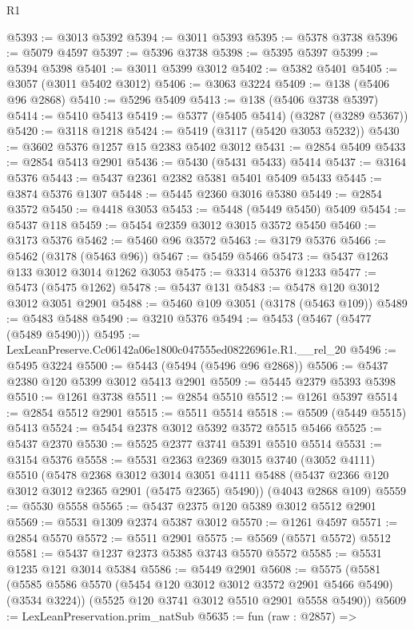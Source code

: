 \begin{lexlean}{R1}
\begin{coremodule}
@5393 := @3013 @5392
@5394 := @3011 @5393
@5395 := @5378 @3738
@5396 := @5079 @4597
@5397 := @5396 @3738
@5398 := @5395 @5397
@5399 := @5394 @5398
@5401 := @3011 @5399 @3012
@5402 := @5382 @5401
@5405 := @3057 (@3011 @5402 @3012)
@5406 := @3063 @3224
@5409 := @138 (@5406 @96 @2868)
@5410 := @5296 @5409
@5413 := @138 (@5406 @3738 @5397)
@5414 := @5410 @5413
@5419 := @5377 (@5405 @5414) (@3287 (@3289 @5367))
@5420 := @3118 @1218
@5424 := @5419 (@3117 (@5420 @3053 @5232))
@5430 := @3602 @5376 @1257 @15 @2383 @5402 @3012
@5431 := @2854 @5409
@5433 := @2854 @5413 @2901
@5436 := @5430 (@5431 @5433) @5414
@5437 := @3164 @5376
@5443 := @5437 @2361 @2382 @5381 @5401 @5409 @5433
@5445 := @3874 @5376 @1307
@5448 := @5445 @2360 @3016 @5380
@5449 := @2854 @3572
@5450 := @4418 @3053
@5453 := @5448 (@5449 @5450) @5409
@5454 := @5437 @118
@5459 := @5454 @2359 @3012 @3015 @3572 @5450
@5460 := @3173 @5376
@5462 := @5460 @96 @3572
@5463 := @3179 @5376
@5466 := @5462 (@3178 (@5463 @96))
@5467 := @5459 @5466
@5473 := @5437 @1263 @133 @3012 @3014 @1262 @3053
@5475 := @3314 @5376 @1233
@5477 := @5473 (@5475 @1262)
@5478 := @5437 @131
@5483 := @5478 @120 @3012 @3012 @3051 @2901
@5488 := @5460 @109 @3051 (@3178 (@5463 @109))
@5489 := @5483 @5488
@5490 := @3210 @5376
@5494 := @5453 (@5467 (@5477 (@5489 @5490)))
@5495 := LexLeanPreserve.Cc06142a06e1800c047555ed08226961e.R1.__rel_20
@5496 := @5495 @3224
@5500 := @5443 (@5494 (@5496 @96 @2868))
@5506 := @5437 @2380 @120 @5399 @3012 @5413 @2901
@5509 := @5445 @2379 @5393 @5398
@5510 := @1261 @3738
@5511 := @2854 @5510
@5512 := @1261 @5397
@5514 := @2854 @5512 @2901
@5515 := @5511 @5514
@5518 := @5509 (@5449 @5515) @5413
@5524 := @5454 @2378 @3012 @5392 @3572 @5515 @5466
@5525 := @5437 @2370
@5530 := @5525 @2377 @3741 @5391 @5510 @5514
@5531 := @3154 @5376
@5558 := @5531
    @2363
    @2369
    @3015
    @3740
    (@3052 @4111)
    @5510
    (@5478
      @2368
      @3012
      @3014
      @3051
      @4111
      @5488
      (@5437 @2366 @120 @3012 @3012 @2365 @2901 (@5475 @2365) @5490))
    (@4043 @2868 @109)
@5559 := @5530 @5558
@5565 := @5437 @2375 @120 @5389 @3012 @5512 @2901
@5569 := @5531 @1309 @2374 @5387 @3012
@5570 := @1261 @4597
@5571 := @2854 @5570
@5572 := @5511 @2901
@5575 := @5569 (@5571 @5572) @5512
@5581 := @5437 @1237 @2373 @5385 @3743 @5570 @5572
@5585 := @5531 @1235 @121 @3014 @5384
@5586 := @5449 @2901
@5608 := @5575
    (@5581
      (@5585 @5586 @5570 (@5454 @120 @3012 @3012 @3572 @2901 @5466 @5490) (@3534 @3224))
      (@5525 @120 @3741 @3012 @5510 @2901 @5558 @5490))
@5609 := LexLeanPreservation.prim_natSub
@5635 := fun (raw : @2857) =>

\end{coremodule}
\end{lexlean}
